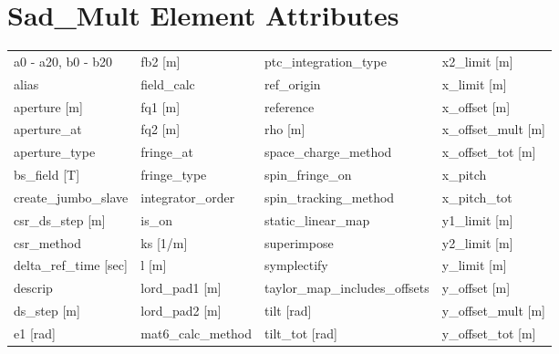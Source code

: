  \section{Sad_Mult Element Attributes}
 \label{s:list.sad.mult}
 
 \begin{tabular}{llll} \toprule
a0 - a20, b0 - b20               & fb2 [m]                          & ptc_integration_type             & x2_limit [m]                     \\
alias                            & field_calc                       & ref_origin                       & x_limit [m]                      \\
aperture [m]                     & fq1 [m]                          & reference                        & x_offset [m]                     \\
aperture_at                      & fq2 [m]                          & rho [m]                          & x_offset_mult [m]                \\
aperture_type                    & fringe_at                        & space_charge_method              & x_offset_tot [m]                 \\
bs_field [T]                     & fringe_type                      & spin_fringe_on                   & x_pitch                          \\
create_jumbo_slave               & integrator_order                 & spin_tracking_method             & x_pitch_tot                      \\
csr_ds_step [m]                  & is_on                            & static_linear_map                & y1_limit [m]                     \\
csr_method                       & ks [1/m]                         & superimpose                      & y2_limit [m]                     \\
delta_ref_time [sec]             & l [m]                            & symplectify                      & y_limit [m]                      \\
descrip                          & lord_pad1 [m]                    & taylor_map_includes_offsets      & y_offset [m]                     \\
ds_step [m]                      & lord_pad2 [m]                    & tilt [rad]                       & y_offset_mult [m]                \\
e1 [rad]                         & mat6_calc_method                 & tilt_tot [rad]                   & y_offset_tot [m]                 \\

\end{tabular}
